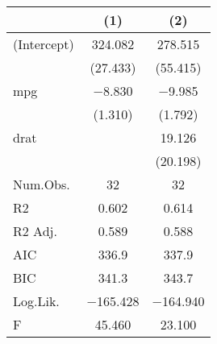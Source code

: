 
\begin{tabular}[t]{lcc}
\toprule
  & (1) & (2)\\
\midrule
(Intercept) & \num{324.082} & \num{278.515}\\
 & (\num{27.433}) & (\num{55.415})\\
mpg & \num{-8.830} & \num{-9.985}\\
 & (\num{1.310}) & (\num{1.792})\\
drat &  & \num{19.126}\\
 &  & (\num{20.198})\\
\midrule
Num.Obs. & \num{32} & \num{32}\\
R2 & \num{0.602} & \num{0.614}\\
R2 Adj. & \num{0.589} & \num{0.588}\\
AIC & \num{336.9} & \num{337.9}\\
BIC & \num{341.3} & \num{343.7}\\
Log.Lik. & \num{-165.428} & \num{-164.940}\\
F & \num{45.460} & \num{23.100}\\
\bottomrule
\end{tabular}
